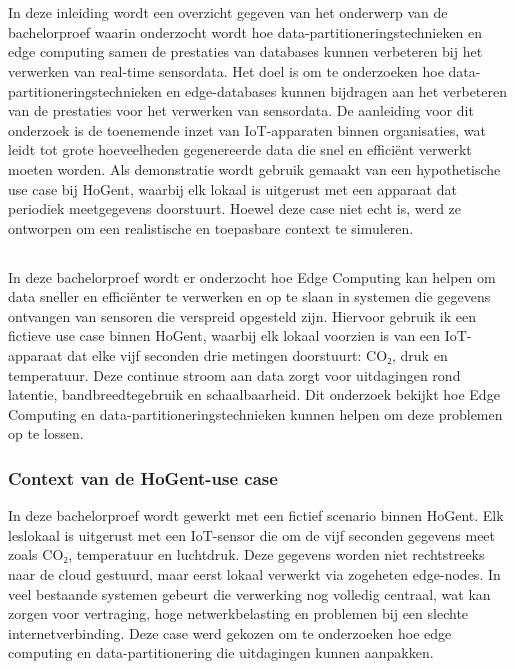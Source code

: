 
\chapter{}%
\label{ch:inleiding}

In deze inleiding wordt een overzicht gegeven van het onderwerp van de bachelorproef waarin onderzocht wordt hoe data-partitioneringstechnieken en edge computing samen de prestaties van databases kunnen verbeteren bij het verwerken van real-time sensordata. 
Het doel is om te onderzoeken hoe data-partitioneringstechnieken en edge-databases kunnen bijdragen aan het verbeteren van de prestaties voor het verwerken van sensordata.
De aanleiding voor dit onderzoek is de toenemende inzet van IoT-apparaten binnen organisaties, wat leidt tot grote hoeveelheden gegenereerde data die snel en efficiënt verwerkt moeten worden. 
Als demonstratie wordt gebruik gemaakt van een hypothetische use case bij HoGent, waarbij elk lokaal is uitgerust met een apparaat dat periodiek meetgegevens doorstuurt. 
Hoewel deze case niet echt is, werd ze ontworpen om een realistische en toepasbare context te simuleren.
\section{}%
\label{sec:probleemstelling}

In deze bachelorproef wordt er onderzocht hoe Edge Computing kan helpen om data sneller en efficiënter te verwerken en op te slaan in  systemen die gegevens ontvangen van sensoren die verspreid opgesteld zijn. 
Hiervoor gebruik ik een fictieve use case binnen HoGent, waarbij elk lokaal voorzien is van een IoT-apparaat dat elke vijf seconden drie metingen doorstuurt: CO₂, druk en temperatuur.
Deze continue stroom aan data zorgt voor uitdagingen rond latentie, bandbreedtegebruik en schaalbaarheid. 
Dit onderzoek bekijkt hoe Edge Computing en data-partitioneringstechnieken kunnen helpen om deze problemen op te lossen.

\subsection*{Context van de HoGent-use case}
In deze bachelorproef wordt gewerkt met een fictief scenario binnen HoGent. Elk leslokaal is uitgerust met een IoT-sensor die om de vijf seconden gegevens meet zoals CO₂, temperatuur en luchtdruk. Deze gegevens worden niet rechtstreeks naar de cloud gestuurd, maar eerst lokaal verwerkt via zogeheten edge-nodes. In veel bestaande systemen gebeurt die verwerking nog volledig centraal, wat kan zorgen voor vertraging, hoge netwerkbelasting en problemen bij een slechte internetverbinding. Deze case werd gekozen om te onderzoeken hoe edge computing en data-partitionering die uitdagingen kunnen aanpakken.


